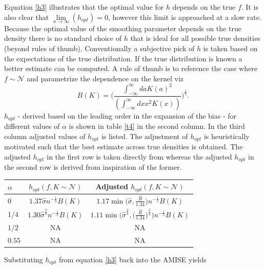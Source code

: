 Equation \eqref{h3} illustrates that the optimal value for $h$ depends on the true $f$. It is also clear that $\lim\limits_{n\rightarrow \infty}(h_{opt})=0$, however this limit is approached at a slow rate. Because the optimal value of the smoothing parameter depends on the true density there is no standard choice of $h$ that is ideal for all possible true densities (beyond rules of thumb). Conventionally a subjective pick of $h$ is taken based on the expectations of the true distribution. If the true distribution is known a better estimate can be computed. A rule of thumb is to reference the case where $f\sim\mathcal{N}$ and parametrize the dependence on the kernel viz
\begin{equation}
	B(K)=\bigg(\frac{\int_{-\infty}^{\infty}da K(a)^2}{(\int_{-\infty}^{\infty}dxx^2K(x))}\bigg)^\frac{1}{5}.
\end{equation}
$h_{opt}$ - derived based on the leading order in the expansion of the bias - for different values of $\alpha$ is shown in table \ref{t4} in the second column. In the third column adjusted values of $h_{opt}$ is listed. The adjustment of $h_{opt}$ is heuristically motivated such that the best estimate across true densities is obtained\citep{silverman}. The adjusted $h_{opt}$ in the first row is taken directly from \citep{silverman} whereas the adjusted $h_{opt}$ in the second row is derived from inspiration of the former. 
\begin{center}
	\begin{tabular}{ l|| c| c|}
		$\alpha$ & $h_{opt}(f,K\sim \mathcal{N})$  & Adjusted $h_{opt}(f,K\sim \mathcal{N})$\\
		\hline
		$0$ & $1.37\hat{\sigma} n^{-\frac{1}{5}}B(K)$ & $1.17\min\big(\hat{\sigma},\frac{\hat{R}}{1.34}\big)n^{-\frac{1}{5}}B(K)$ \\
		$1/4$ & $1.30\hat{\sigma}^\frac{3}{4}n^{-\frac{1}{5}}B(K)$ & $1.11\min\big(\hat{\sigma}^\frac{3}{4},\big(\frac{\hat{R}}{1.34}\big)^\frac{3}{4}\big)n^{-\frac{1}{5}}B(K)$ \\
		$1/2$ & NA&  NA\\
		$0.55$ &  NA & NA \\
	\end{tabular}
	\captionsetup{width=0.95\textwidth}
	\label{t4}
\end{center}
Substituting $h_{opt}$ from equation \eqref{h3} back into the AMISE yields
